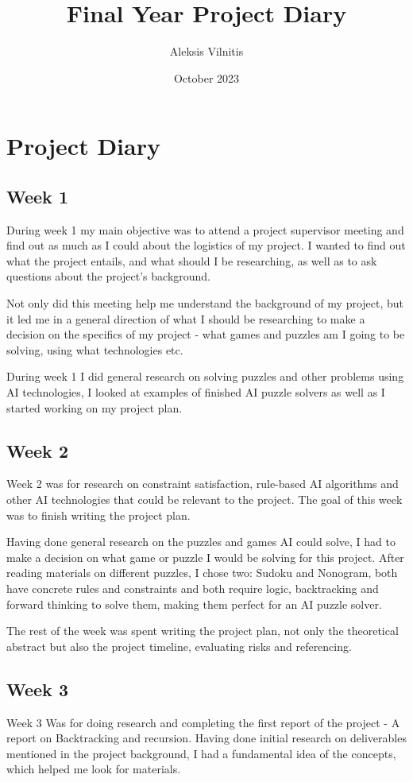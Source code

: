 \documentclass{article}
\title{Final Year Project Diary}
\author{Aleksis Vilnitis}
\date{October 2023}
\begin{document}
\maketitle

\section{Project Diary}
\subsection{Week 1}
During week 1 my main objective was to attend a project supervisor meeting and find out as much as I could about the logistics of my project. I wanted to find out what the project entails, and what should I be researching, as well as to ask questions about the project's background. 

Not only did this meeting help me understand the background of my project, but it led me in a general direction of what I should be researching to make a decision on the specifics of my project - what games and puzzles am I going to be solving, using what technologies etc. 

During week 1 I did general research on solving puzzles and other problems using AI technologies, I looked at examples of finished AI puzzle solvers as well as I started working on my project plan. \\



\subsection{Week 2}
Week 2 was for research on constraint satisfaction, rule-based AI algorithms and other AI technologies that could be relevant to the project. The goal of this week was to finish writing the project plan.

Having done general research on the puzzles and games AI could solve, I had to make a decision on what game or puzzle I would be solving for this project. After reading materials on different puzzles, I chose two: Sudoku and Nonogram, both have concrete rules and constraints and both require logic, backtracking and forward thinking to solve them, making them perfect for an AI puzzle solver.

The rest of the week was spent writing the project plan, not only the theoretical abstract but also the project timeline, evaluating risks and referencing.

\subsection{Week 3}
Week 3 Was for doing research and completing the first report of the project - A report on Backtracking and recursion. Having done initial research on deliverables mentioned in the project background, I had a fundamental idea of the concepts, which helped me look for materials.
\end{document}
